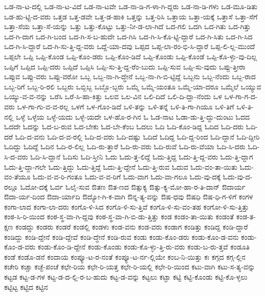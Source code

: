 {ಒಡ-ನಾ-ಟ-ದಲ್ಲಿ
ಒಡ-ನಾ-ಟ-ವಿದೆ
ಒಡ-ನಾ-ಟವೇ
ಒಡ-ನಾ-ಡಿ-ಗ-ಳಾ-ಗಿ-ದ್ದರು
ಒಡ-ನಾ-ಡಿ-ಗಳು
ಒಡ-ಮೂ-ಡಿತು
ಒಡ-ಹು-ಟ್ಟಿ-ದ-ವರು
ಒತ್ತಡ
ಒತ್ತ-ಡವೇ
ಒತ್ತ-ಡ-ಹಾಕಿ
ಒತ್ತನ್ನು
ಒತ್ತ-ರಿಸಿ
ಒತ್ತಾಯ
ಒತ್ತಾ-ಯಕ್ಕೆ
ಒತ್ತಾಸೆ
ಒತ್ತಾ-ಸೆಗೆ
ಒತ್ತಾ-ಸೆಯ
ಒತ್ತಾ-ಸೆ-ಯನ್ನು
ಒತ್ತು
ಒತ್ತು-ಕೊಟ್ಟು
ಒತ್ತು-ನೀ-ಡ-ಲಾ-ಗಿದೆ
ಒದ-ಗಲಿ
ಒದಗಿ
ಒದ-ಗಿತು
ಒದ-ಗಿತ್ತು
ಒದ-ಗಿ-ದಾಗ
ಒದ-ಗಿ-ಬಂದ
ಒದ-ಗಿ-ಸ-ಬ-ಹುದೇ
ಒದ-ಗಿಸಿ
ಒದ-ಗಿ-ಸಿ-ಕೊ-ಟ್ಟಿ-ದ್ದಾರೆ
ಒದ-ಗಿ-ಸಿತು
ಒದ-ಗಿ-ಸಿದ
ಒದ-ಗಿ-ಸಿ-ದ್ದಾರೆ
ಒದ-ಗಿ-ಸು-ತ್ತಿ-ದ್ದ-ವರು
ಒದ್ದೆ-ಯಾ-ದವು
ಒಪ್ಪದ
ಒಪ್ಪ-ಲಾ-ರಂ-ಭಿ-ಸಿ-ದ್ದಾರೆ
ಒಪ್ಪ-ಲಿ-ಲ್ಲ-ಮುಂದೆ
ಒಪ್ಪಲೇ
ಒಪ್ಪಿ
ಒಪ್ಪಿ-ಕೊಂಡ
ಒಪ್ಪಿ-ಕೊಂ-ಡರು
ಒಪ್ಪಿ-ಕೊಂ-ಡಿದೆ
ಒಪ್ಪಿ-ಕೊಂಡು
ಒಪ್ಪಿ-ಕೊಂಡೆ
ಒಪ್ಪಿ-ಕೊ-ಳ್ಳು-ವು-ದಿಲ್ಲ
ಒಪ್ಪಿಗೆ
ಒಪ್ಪಿದ
ಒಪ್ಪಿ-ದರು
ಒಪ್ಪಿದೆ
ಒಪ್ಪಿಸಿ
ಒಪ್ಪಿ-ಸು-ತ್ತಿ-ದ್ದ-ರೆಂ-ಬುದು
ಒಪ್ಪಿ-ಸುವ
ಒಪ್ಪಿ-ಸು-ವುದು
ಒಪ್ಪು-ತ್ತೀರಾ
ಒಪ್ಪುವ
ಒಪ್ಪು-ವರು
ಒಪ್ಪು-ವರೋ
ಒಬ್ಬ
ಒಬ್ಬ-ನಾ-ಗಿ-ದ್ಧೇನೆ
ಒಬ್ಬ-ನಾ-ಗಿ-ಬಿ-ಟ್ಟಿದ್ದೆ
ಒಬ್ಬನು
ಒಬ್ಬ-ನೆಂದು
ಒಬ್ಬ-ರಾದ
ಒಬ್ಬ-ರಿಗೆ
ಒಬ್ಬ-ರಿ-ರಲಿ
ಒಬ್ಬರು
ಒಬ್ಬಿಬ್ಬ
ಒಬ್ಬೊ-ಬ್ಬರು
ಒಮ್ಮೆ
ಒಮ್ಮೆ-ಯಂತೂ
ಒಮ್ಮೆ-ಯಾ-ದರೂ
ಒಮ್ಮೆಲೆ
ಒಯ್ಯುವ
ಒಯ್ಯು-ವ-ವ-ನನ್ನು
ಒರೆಸಿ
ಒರೆ-ಸಿ-ಹಾ-ಕಿತ್ತು
ಒಲವ
ಒಲ-ವಿನ
ಒಲಿ-ದಿದೆ
ಒಲಿ-ದಿ-ದ್ದಾ-ನೆಂದು
ಒಳ
ಒಳ-ಗಾ-ಗ-ದ-ವರು
ಒಳ-ಗಾ-ಗು-ವ-ವ-ರಲ್ಲ
ಒಳಗೆ
ಒಳ-ಗೊಂ-ಡಿದೆ
ಒಳಿ-ತನ್ನು
ಒಳಿ-ತನ್ನೆ
ಒಳಿ-ತಿ-ಗಾ-ಗಿಯೂ
ಒಳಿ-ತಿಗೆ
ಒಳಿ-ತಿ-ನಲ್ಲಿ
ಒಳ್ಳೆ
ಒಳ್ಳೆಯ
ಒಳ್ಳೆ-ಯದು
ಒಳ್ಳೆ-ಯದೇ
ಒಳ-ಹೊ-ರ-ಗಿನ
ಓ
ಓಡ-ನಾಟ
ಓಡಾ-ಡು-ತ್ತಿ-ದ್ದು-ದುಂಟು
ಓದದ
ಓದದೇ
ಓದನ್ನು
ಓದ-ಬ-ರುವ
ಓದ-ಬೇಕು
ಓದ-ಬೇ-ಕೆಂಬ
ಓದಲು
ಓದಿ
ಓದಿ-ಕೊಂ-ಡಿದ್ದ
ಓದಿದ
ಓದಿ-ದರು
ಓದಿ-ದರೆ
ಓದಿ-ದ-ವನು
ಓದಿ-ದ-ವ-ರಲ್ಲಿ
ಓದಿ-ದ-ವರು
ಓದಿ-ದಷ್ಟು
ಓದಿದೆ
ಓದಿದ್ದ
ಓದಿ-ದ್ದ-ರಿಂದ
ಓದಿ-ದ್ದಾನೆ
ಓದಿ-ದ್ದೀರಿ
ಓದಿದ್ದು
ಓದಿದ್ದೆ
ಓದಿನ
ಓದಿ-ರ-ಲಿಲ್ಲ
ಓದಿ-ರು-ತ್ತಾರೆ
ಓದಿ-ರು-ವರು
ಓದಿ-ರುವೆ
ಓದಿ-ರು-ವೆಯಾ
ಓದಿ-ಸಿ-ದರು
ಓದಿ-ಸಿ-ದ-ವರು
ಓದಿ-ಸಿ-ದ್ದಾನೆ
ಓದಿಸು
ಓದಿ-ಸ್ತೀನಿ
ಓದು
ಓದು-ತ್ತ-ಲಿದ್ದೆ
ಓದು-ತ್ತಿದ್ದ
ಓದು-ತ್ತಿ-ದ್ದ-ವರು
ಓದು-ತ್ತಿ-ದ್ದಾಗ
ಓದು-ತ್ತಿ-ದ್ದಾ-ಗಲೇ
ಓದು-ತ್ತಿದ್ದು
ಓದು-ತ್ತಿದ್ದೆ
ಓದು-ತ್ತಿ-ದ್ದೇನೆ
ಓದು-ತ್ತಿ-ರುವ
ಓದುವ
ಓದು-ವಂ-ತಾ-ಯಿತು
ಓದು-ವಂ-ತೆಯೂ
ಓದು-ವ-ವ-ರಿ-ಗಂತೂ
ಓದು-ವ-ವ-ರಿಗೆ
ಓದು-ವಾಗ
ಓದು-ವಾ-ಗಲೂ
ಓದು-ವು-ದಕ್ಕೆ
ಓದು-ವು-ದ-ರಲ್ಲೂ
ಓದೋ-ದಕ್ಕೆ
ಓರ್ವ
ಓಲೈ-ಸುವ
ಔತಣ
ಔತ-ಣದ
ಔತ್ಸುಕ್ಯ
ಔತ್ಸು-ಕ್ಯ-ಮೋ-ಹಾ-ರ-ತಿ-ದಾನ್
ಔದಾರ್ಯ
ಔದಾ-ರ್ಯ-ದಿಂದ
ಔದಾ-ರ್ಯಾದಿ
ಔದ್ಯೋ-ಗಿ-ಕ-ವಾಗಿ
ಔನ್ನ-ತ್ಯ-ವನ್ನು
ಔಷ-ಧವು
ಔಷಧಿ
ಔಷ-ಧಿ-ಗ-ಳಿಗೆ
ಕಂಗಳ
ಕಂಗಾ-ಲಾದ
ಕಂಗಾ-ಲಾ-ದರು
ಕಂಗೊ-ಳಿ-ಸಿದ
ಕಂಗೊ-ಳಿ-ಸು-ತ್ತಿವೆ
ಕಂಗೊ-ಳಿ-ಸು-ವಂ-ತಹ
ಕಂಗೋ-ಳಿ-ಸು-ತ್ತಿತ್ತು
ಕಂಠ-ಸಿ-ರಿ-ಯಿಂದ
ಕಂಠ-ಸ್ಥ-ವಾ-ಗಿ-ದ್ದವು
ಕಂಠ-ಸ್ಥ-ವಾ-ಗಿ-ಬಿ-ಡು-ತ್ತಿತ್ತು
ಕಂಡ
ಕಂಡಂ-ತಾ-ಯಿತು
ಕಂಡಂತೆ
ಕಂಡ-ತ-ಕ್ಷಣ
ಕಂಡದ್ದು
ಕಂಡರು
ಕಂಡರೆ
ಕಂಡಲ್ಲಿ
ಕಂಡಳು
ಕಂಡ-ವನು
ಕಂಡ-ವರು
ಕಂಡಾಗ
ಕಂಡಿತ್ತು
ಕಂಡಿದ್ದ
ಕಂಡಿ-ದ್ದಾರೆ
ಕಂಡಿದ್ದು
ಕಂಡಿ-ದ್ದೇನೆ
ಕಂಡಿ-ದ್ದೇವೆ
ಕಂಡಿ-ದ್ಧೇನೆ
ಕಂಡಿ-ರುವ
ಕಂಡು
ಕಂಡು-ಕೊಂ-ಡರು
ಕಂಡು-ಕೊಂ-ಡ-ವನು
ಕಂಡು-ಕೊಂ-ಡ-ವರು
ಕಂಡು-ಕೊಂ-ಡಿ-ದ್ದೇನೆ
ಕಂಡು-ಕೊಂಡು
ಕಂಡು-ಕೊ-ಳ್ಳು-ತ್ತಿ-ರು-ವರು
ಕಂಡು-ಬ-ರು-ತ್ತವೆ
ಕಂಡೂತಿ
ಕಂಡೆ
ಕಂಡೊ-ಡನೆ
ಕಂದಾಯ
ಕಂಪ್ಯೂ-ಟ-ರ-ನಂತೆ
ಕಂಪ್ಯೂ-ಟ-ರ್ನ-ಲ್ಲಿಯೇ
ಕಂಬ-ನಿ-ಯಿತ್ತು
ಕಃ
ಕಗ್ಗದ
ಕಗ್ಗ-ಲ್ಲಿನ
ಕಚೇರಿ
ಕಚ್ಚಾ
ಕಚ್ಛೆ-ಪಂಚೆ
ಕಛೇ-ರಿಯ
ಕಛೇ-ರಿ-ಯತ್ತ
ಕಛೇ-ರಿ-ಯಲ್ಲಿ
ಕಛೇ-ರಿ-ಯಿಂದ
ಕಟು-ವಾಗಿ
ಕಟು-ಸ-ತ್ಯ-ವನ್ನು
ಕಟ್ಟಡ
ಕಟ್ಟ-ಡ-ಗಳ
ಕಟ್ಟ-ಡ-ದ-ಲ್ಲಿ-ರ-ಬ-ಹುದು
ಕಟ್ಟ-ಡ-ವನ್ನು
ಕಟ್ಟಲು
ಕಟ್ಟಾ
ಕಟ್ಟಿ
ಕಟ್ಟಿ-ಕೊಂಡು
ಕಟ್ಟಿ-ಕೊ-ಳ್ಳಲು
ಕಟ್ಟಿಟ್ಟ
ಕಟ್ಟಿದ
ಕಟ್ಟಿನ
}
